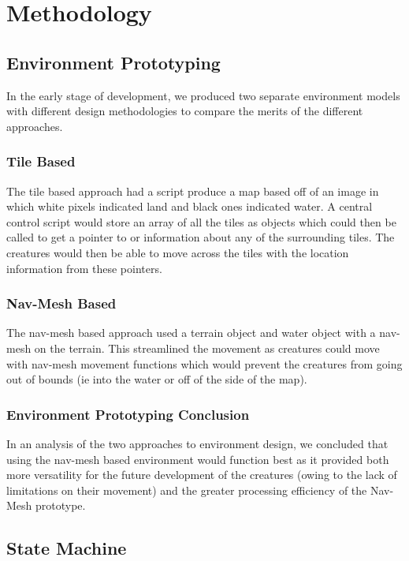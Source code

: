 \documentclass[a4paper, oneside, 11pt]{report}
\begin{document}
\chapter{Methodology}\label{MethLab}


\section{Environment Prototyping}

In the early stage of development, we produced two separate environment models with different design methodologies to compare the merits of the different approaches.

\subsection{Tile Based}
The tile based approach had a script produce a map based off of an image in which white pixels indicated land and black ones indicated water.
A central control script would store an array of all the tiles as objects which could then be called to get a pointer to or information about any of the surrounding tiles.
The creatures would then be able to move across the tiles with the location information from these pointers.

\subsection{Nav-Mesh Based}
The nav-mesh based approach used a terrain object and water object with a nav-mesh on the terrain. This streamlined the movement as creatures could move with nav-mesh movement functions which would prevent the creatures from going out of bounds (ie into the water or off of the side of the map).

\subsection{Environment Prototyping Conclusion}

In an analysis of the two approaches to environment design, we concluded that using the nav-mesh based environment would function best as it provided both more versatility for the future development of the creatures (owing to the lack of limitations on their movement) and the greater processing efficiency of the Nav-Mesh prototype.

\section{State Machine}
\end{document}
